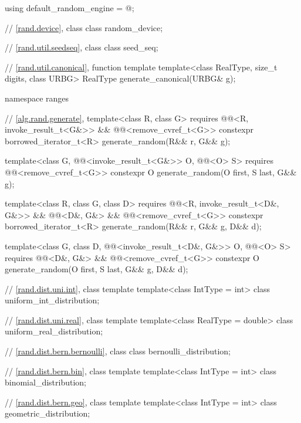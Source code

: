 \begin{codeblock}
{  using default_random_engine = @\seebelow@;

  // \ref{rand.device}, class 
  class random_device;

  // \ref{rand.util.seedseq}, class 
  class seed_seq;

  // \ref{rand.util.canonical}, function template 
  template<class RealType, size_t digits, class URBG>
    RealType generate_canonical(URBG& g);

  namespace ranges {
    // \ref{alg.rand.generate}, 
    template<class R, class G>
      requires @@<R, invoke_result_t<G&>> &&
               @@<remove_cvref_t<G>>
      constexpr borrowed_iterator_t<R> generate_random(R&& r, G&& g);

    template<class G, @@<invoke_result_t<G&>> O, @@<O> S>
      requires @@<remove_cvref_t<G>>
      constexpr O generate_random(O first, S last, G&& g);

    template<class R, class G, class D>
      requires @@<R, invoke_result_t<D&, G&>> && @@<D&, G&> &&
               @@<remove_cvref_t<G>>
    constexpr borrowed_iterator_t<R> generate_random(R&& r, G&& g, D&& d);

    template<class G, class D, @@<invoke_result_t<D&, G&>> O, @@<O> S>
      requires @@<D&, G&> && @@<remove_cvref_t<G>>
    constexpr O generate_random(O first, S last, G&& g, D&& d);
  }

  // \ref{rand.dist.uni.int}, class template 
  template<class IntType = int>
    class uniform_int_distribution;

  // \ref{rand.dist.uni.real}, class template 
  template<class RealType = double>
    class uniform_real_distribution;

  // \ref{rand.dist.bern.bernoulli}, class 
  class bernoulli_distribution;

  // \ref{rand.dist.bern.bin}, class template 
  template<class IntType = int>
    class binomial_distribution;

  // \ref{rand.dist.bern.geo}, class template 
  template<class IntType = int>
    class geometric_distribution;

}
\end{codeblock}
